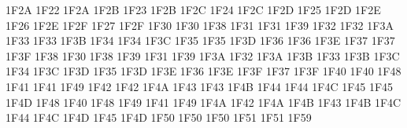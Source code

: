 \setcclcuc 1F2A 1F22 1F2A %
\setcclcuc 1F2B 1F23 1F2B %
\setcclcuc 1F2C 1F24 1F2C %
\setcclcuc 1F2D 1F25 1F2D %
\setcclcuc 1F2E 1F26 1F2E %
\setcclcuc 1F2F 1F27 1F2F %
\setcclcuc 1F30 1F30 1F38 %
\setcclcuc 1F31 1F31 1F39 %
\setcclcuc 1F32 1F32 1F3A %
\setcclcuc 1F33 1F33 1F3B %
\setcclcuc 1F34 1F34 1F3C %
\setcclcuc 1F35 1F35 1F3D %
\setcclcuc 1F36 1F36 1F3E %
\setcclcuc 1F37 1F37 1F3F %
\setcclcuc 1F38 1F30 1F38 %
\setcclcuc 1F39 1F31 1F39 %
\setcclcuc 1F3A 1F32 1F3A %
\setcclcuc 1F3B 1F33 1F3B %
\setcclcuc 1F3C 1F34 1F3C %
\setcclcuc 1F3D 1F35 1F3D %
\setcclcuc 1F3E 1F36 1F3E %
\setcclcuc 1F3F 1F37 1F3F %
\setcclcuc 1F40 1F40 1F48 %
\setcclcuc 1F41 1F41 1F49 %
\setcclcuc 1F42 1F42 1F4A %
\setcclcuc 1F43 1F43 1F4B %
\setcclcuc 1F44 1F44 1F4C %
\setcclcuc 1F45 1F45 1F4D %
\setcclcuc 1F48 1F40 1F48 %
\setcclcuc 1F49 1F41 1F49 %
\setcclcuc 1F4A 1F42 1F4A %
\setcclcuc 1F4B 1F43 1F4B %
\setcclcuc 1F4C 1F44 1F4C %
\setcclcuc 1F4D 1F45 1F4D %
\setcclcuc 1F50 1F50 1F50 %
\setcclcuc 1F51 1F51 1F59 %
